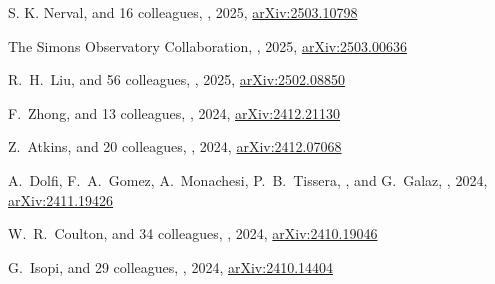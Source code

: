 \begin{etaremune}
\item
S. K. Nerval, and 16 colleagues,
,
2025, \href{https://ui.adsabs.harvard.edu/abs/2025arXiv250310798N}{arXiv:2503.10798}
\submitted{\apj}

\item
The Simons Observatory Collaboration,
,
2025, \href{https://ui.adsabs.harvard.edu/abs/2025arXiv250300636A}{arXiv:2503.00636}
\submitted{\jcap}

\item
R.~H.~Liu, and 56 colleagues,
,
2025, \href{https://ui.adsabs.harvard.edu/abs/2025arXiv250208850L}{arXiv:2502.08850}
\submitted{\prd}

\item
F.~Zhong, and 13 colleagues,
,
2024, \href{https://ui.adsabs.harvard.edu/abs/2024arXiv241221130Z}{arXiv:2412.21130}
\submitted{\mnras}

\item
Z.~Atkins, and 20 colleagues,
,
2024, \href{https://ui.adsabs.harvard.edu/abs/2024arXiv241207068A}{arXiv:2412.07068}
\submitted{\jcap}
    
\item
A.~Dolfi, F.~A.~Gomez, A.~Monachesi, P.~B.~Tissera, \myself, and G.~Galaz,
,
2024, \href{https://ui.adsabs.harvard.edu/abs/2024arXiv241119426D}{arXiv:2411.19426}
\submitted{\mnras}
    
\item
W.~R.~Coulton, and 34 colleagues,
,
2024, \href{https://ui.adsabs.harvard.edu/abs/2024arXiv241019046C}{arXiv:2410.19046}
\submitted{\prd}

\item
G.~Isopi, and 29 colleagues,
,
2024, \href{https://ui.adsabs.harvard.edu/abs/2024arXiv241014404I}{arXiv:2410.14404}
\submitted{\jcap}


\end{etaremune}
